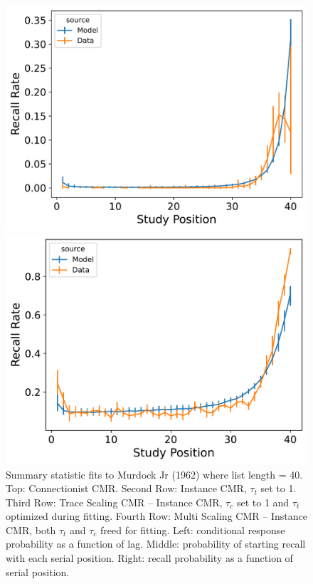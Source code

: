 \documentclass[
  letterpaper,
  11pt,
  english,
  singlespacing,
  headsepline]{MastersDoctoralThesis}
\begin{document}
\begin{figure}
\begin{minipage}{0.33\linewidth}
\includegraphics{icmr_figures/Murdock1962_MultiScalingCMR_Model_Fitting_LL40_pnr-1.png}\end{minipage}%
%
\begin{minipage}{0.33\linewidth}
\includegraphics{icmr_figures/Murdock1962_MultiScalingCMR_Model_Fitting_LL40_spc-1.png}\end{minipage}%

\caption{\label{fig-murdock1962memory40}Summary statistic fits to
Murdock Jr (1962) where list length = 40. Top: Connectionist CMR. Second
Row: Instance CMR, \(\tau_{t}\) set to 1. Third Row: Trace Scaling CMR
-- Instance CMR, \(\tau_{c}\) set to 1 and \(\tau_{t}\) optimized during
fitting. Fourth Row: Multi Scaling CMR -- Instance CMR, both \(\tau_t\)
and \(\tau_c\) freed for fitting. Left: conditional response probability
as a function of lag. Middle: probability of starting recall with each
serial position. Right: recall probability as a function of serial
position.}

\end{figure}%
\end{document}
